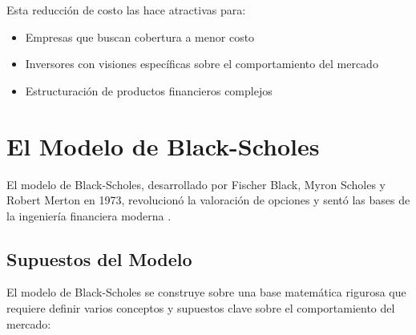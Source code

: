 Esta reducción de costo las hace atractivas para:
\begin{itemize}
    \item Empresas que buscan cobertura a menor costo
    \item Inversores con visiones específicas sobre el comportamiento del mercado
    \item Estructuración de productos financieros complejos
\end{itemize}

\section{El Modelo de Black-Scholes}

El modelo de Black-Scholes, desarrollado por Fischer Black, Myron Scholes y Robert Merton en 1973, revolucionó la valoración de opciones y sentó las bases de la ingeniería financiera moderna \cite{black1973pricing}.

\subsection{Supuestos del Modelo}

El modelo de Black-Scholes se construye sobre una base matemática rigurosa que requiere definir varios conceptos y supuestos clave sobre el comportamiento del mercado:

